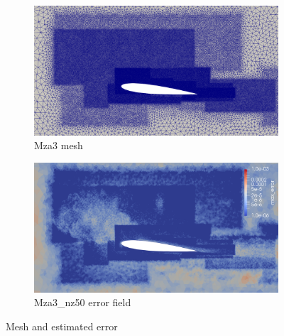 \begin{figure}[H]
\begin{subfigure}[b]{0.475\textwidth}
	\centering
	\includegraphics[width=1\textwidth]{figures/zonal_adapt_results/Mesh_and_error_plots/Mza3_inplane.png}
	\caption{Mza3 mesh}
	\label{fig:zonal_Mza3_mesh}
\end{subfigure}
\begin{subfigure}[b]{0.475\textwidth}
	\centering
	\includegraphics[width=1\textwidth]{figures/zonal_adapt_results/Mesh_and_error_plots/Mza3_error.png}
	\caption{Mza3\_nz50 error field}
	\label{fig:zonal_Mza3_error}
\end{subfigure}


\caption{Mesh and estimated error}
\end{figure}